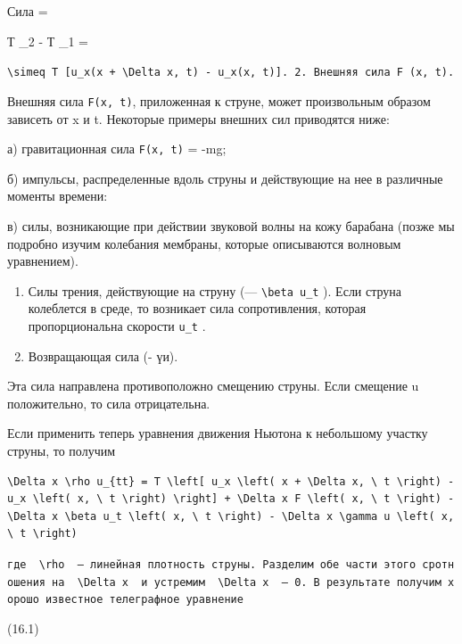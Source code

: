 \documentclass[
  ukrainian,
]{article}
\begin{document}
Сила =

Т  \theta\_2 - Т  \theta\_1 =

\texttt{\textquotesingle{}\textbackslash{}simeq\ T\ {[}u\_x(x\ +\ \textbackslash{}Delta\ x,\ t)\ -\ u\_x(x,\ t){]}.\textquotesingle{}\ 2.\ Внешняя\ сила\ \textquotesingle{}F\ (x,\ t)\textquotesingle{}.}

Внешняя сила \texttt{F(x,\ t)}, приложенная к струне, может произвольным
образом зависеть от x и t. Некоторые примеры внешних сил приводятся
ниже:

а) гравитационная сила \texttt{F(x,\ t)} = -mg;

б) импульсы, распределенные вдоль струны и действующие на нее в
различные моменты времени:

в) силы, возникающие при действии звуковой волны на кожу барабана (позже
мы подробно изучим колебания мембраны, которые описываются волновым
уравнением).

\begin{enumerate}
\def\labelenumi{\arabic{enumi}.}
\setcounter{enumi}{2}
\item
  Силы трения, действующие на струну (---
  \texttt{\textbackslash{}beta\ u\_t} ). Если струна колеблется в среде,
  то возникает сила сопротивления, которая пропорциональна скорости
  \texttt{u\_t} .
\item
  Возвращающая сила (- үи).
\end{enumerate}

Эта сила направлена противоположно смещению струны. Если смещение u
положительно, то сила отрицательна.

Если применить теперь уравнения движения Ньютона к небольшому участку
струны, то получим

\begin{verbatim}
\Delta x \rho u_{tt} = T \left[ u_x \left( x + \Delta x, \ t \right) - u_x \left( x, \ t \right) \right] + \Delta x F \left( x, \ t \right) - \Delta x \beta u_t \left( x, \ t \right) - \Delta x \gamma u \left( x, \ t \right)
\end{verbatim}

\texttt{где\ \ \textquotesingle{}\textbackslash{}rho\textquotesingle{}\ \ —\ линейная\ плотность\ струны.\ Разделим\ обе\ части\ этого\ сротношения\ на\ \ \textquotesingle{}\textbackslash{}Delta\ x\textquotesingle{}\ \ и\ устремим\ \ \textquotesingle{}\textbackslash{}Delta\ x\textquotesingle{}\ \ —\ 0.\ В\ результате\ получим\ хорошо\ известное\ телеграфное\ уравнение}

(16.1)
\end{document}
